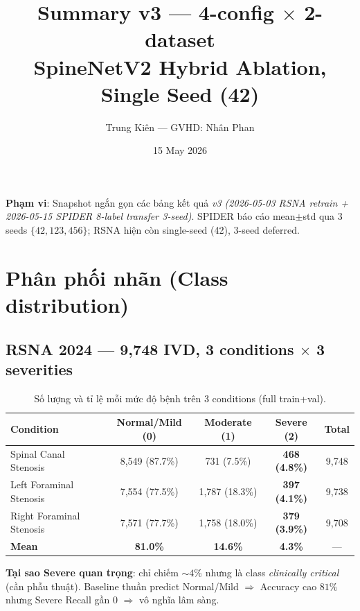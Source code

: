 \documentclass[11pt,a4paper]{article}
\title{Summary v3 --- 4-config $\times$ 2-dataset\\
       \large SpineNetV2 Hybrid Ablation, Single Seed (42)}
\author{Trung Kiên --- GVHD: Nhân Phan}
\date{15 May 2026}
\begin{document}
\maketitle

\noindent\textbf{Phạm vi}: Snapshot ngắn gọn các bảng kết quả \emph{v3
(2026-05-03 RSNA retrain + 2026-05-15 SPIDER 8-label transfer 3-seed)}.
SPIDER báo cáo mean$\pm$std qua 3 seeds $\{42, 123, 456\}$; RSNA hiện
còn single-seed (42), 3-seed deferred.

\section{Phân phối nhãn (Class distribution)}

\subsection{RSNA 2024 --- 9{,}748 IVD, 3 conditions $\times$ 3 severities}

\begin{table}[h]
\centering
\caption{Số lượng và tỉ lệ mỗi mức độ bệnh trên 3 conditions (full train+val).}
\label{tab:rsna_distribution}
\small
\begin{tabular}{lccc|c}
\toprule
\rowcolor{tablehdr}
Condition & \cellcolor{cnormal!30}Normal/Mild (0) & \cellcolor{cmod!30}Moderate (1) & \cellcolor{csevere!30}Severe (2) & Total \\
\midrule
Spinal Canal Stenosis  & 8{,}549 (87.7\%) & 731 (7.5\%)      & \textbf{468 (4.8\%)}  & 9{,}748 \\
Left Foraminal Stenosis  & 7{,}554 (77.5\%) & 1{,}787 (18.3\%) & \textbf{397 (4.1\%)}  & 9{,}738 \\
Right Foraminal Stenosis & 7{,}571 (77.7\%) & 1{,}758 (18.0\%) & \textbf{379 (3.9\%)}  & 9{,}708 \\
\midrule
\textbf{Mean}          & \textbf{81.0\%}  & \textbf{14.6\%}  & \textbf{4.3\%}        & --- \\
\bottomrule
\end{tabular}
\end{table}

\noindent\textbf{Tại sao Severe quan trọng}: chỉ chiếm $\sim 4\%$ nhưng
là class \emph{clinically critical} (cần phẫu thuật). Baseline thuần
predict Normal/Mild $\Rightarrow$ Accuracy cao $81\%$ nhưng Severe
Recall gần $0$ $\Rightarrow$ vô nghĩa lâm sàng.
\end{document}
